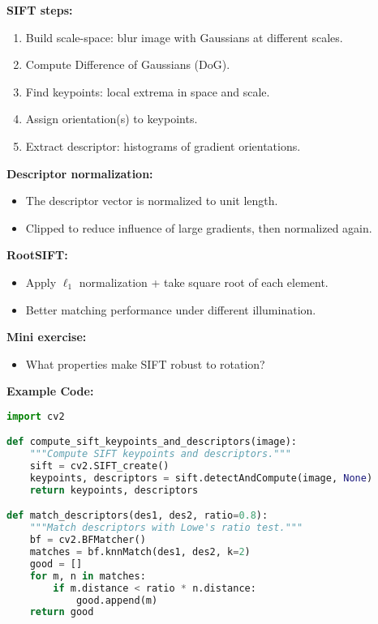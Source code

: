 \documentclass[a4paper,11pt]{article}
\begin{document}
\textbf{SIFT steps:}
\begin{enumerate}
    \item Build scale-space: blur image with Gaussians at different scales.
    \item Compute Difference of Gaussians (DoG).
    \item Find keypoints: local extrema in space and scale.
    \item Assign orientation(s) to keypoints.
    \item Extract descriptor: histograms of gradient orientations.
\end{enumerate}

\textbf{Descriptor normalization:}
\begin{itemize}
    \item The descriptor vector is normalized to unit length.
    \item Clipped to reduce influence of large gradients, then normalized again.
\end{itemize}

\textbf{RootSIFT:}
\begin{itemize}
    \item Apply $\ell_1$ normalization + take square root of each element.
    \item Better matching performance under different illumination.
\end{itemize}

\textbf{Mini exercise:}
\begin{itemize}
    \item What properties make SIFT robust to rotation?
\end{itemize}

\vspace{1em}

\textbf{Example Code:}
\begin{lstlisting}[language=Python]
import cv2

def compute_sift_keypoints_and_descriptors(image):
    """Compute SIFT keypoints and descriptors."""
    sift = cv2.SIFT_create()
    keypoints, descriptors = sift.detectAndCompute(image, None)
    return keypoints, descriptors

def match_descriptors(des1, des2, ratio=0.8):
    """Match descriptors with Lowe's ratio test."""
    bf = cv2.BFMatcher()
    matches = bf.knnMatch(des1, des2, k=2)
    good = []
    for m, n in matches:
        if m.distance < ratio * n.distance:
            good.append(m)
    return good
\end{lstlisting}
\end{document}

